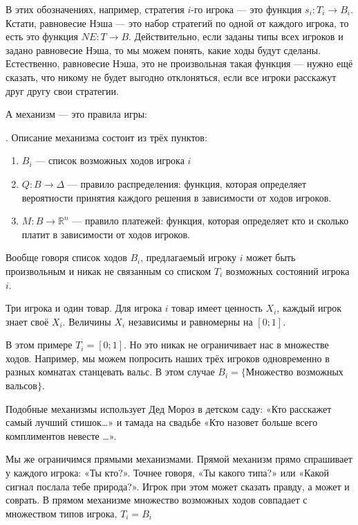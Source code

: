 В этих обозначениях, например, стратегия $ i $-го игрока — это функция $ s_{i}:T_{i}\to B_{i} $. Кстати, равновесие Нэша — это набор стратегий по одной от каждого игрока, то есть это функция $ NE:T\to B $. Действительно, если заданы типы всех игроков и задано равновесие Нэша, то мы можем понять, какие ходы будут сделаны. Естественно, равновесие Нэша, это не произвольная такая функция — нужно ещё сказать, что никому не будет выгодно отклоняться, если все игроки расскажут друг другу свои стратегии.

А механизм — это правила игры:

\begin{mydef} . Описание механизма состоит из трёх пунктов:
\begin{enumerate}
\item $ B_{i} $ — список возможных ходов игрока $ i $
\item $Q:B\to \Delta  $ — правило распределения: функция, которая определяет вероятности принятия каждого решения в зависимости от ходов игроков.
\item $M:B\to \mathbb{R}^{n}  $ — правило платежей: функция, которая определяет кто и сколько платит в зависимости от ходов игроков.
\end{enumerate}
\end{mydef}

Вообще говоря список ходов $ B_{i} $, предлагаемый игроку $ i $ может быть произвольным и никак не связанным со списком $ T_{i} $ возможных состояний игрока $ i $.

\begin{myex}
Три игрока и один товар. Для игрока $ i $ товар имеет ценность $ X_{i} $, каждый игрок знает своё $ X_{i} $. Величины $ X_{i}  $ независимы и равномерны на $ [0;1] $.

В этом примере $ T_{i}=[0;1] $. Но это никак не ограничивает нас в множестве ходов. Например, мы можем попросить наших трёх игроков одновременно в разных комнатах станцевать вальс. В этом случае $B_{i} =\{ $Множество возможных вальсов$\}$.
\end{myex}

Подобные механизмы использует Дед Мороз в детском саду: «Кто расскажет самый лучший стишок\ldots» и тамада на свадьбе «Кто назовет больше всего комплиментов невесте \ldots».

Мы же ограничимся прямыми механизмами. Прямой механизм прямо спрашивает у каждого игрока: «Ты кто?». Точнее говоря, «Ты какого типа?» или «Какой сигнал послала тебе природа?». Игрок при этом может сказать правду, а может и соврать. В прямом механизме множество возможных ходов совпадает с множеством типов игрока, $ T_{i}=B_{i} $


